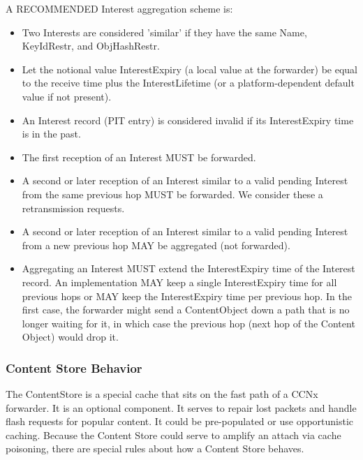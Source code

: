 \documentclass[12pt]{article}
\begin{document}
A RECOMMENDED Interest aggregation scheme is:

\begin{itemize}

\item Two Interests are considered 'similar' if they have the same Name,
   KeyIdRestr, and ObjHashRestr.

\item Let the notional value InterestExpiry (a local value at the
   forwarder) be equal to the receive time plus the InterestLifetime
   (or a platform-dependent default value if not present).

\item An Interest record (PIT entry) is considered invalid if its
   InterestExpiry time is in the past.

\item The first reception of an Interest MUST be forwarded.

\item A second or later reception of an Interest similar to a valid
   pending Interest from the same previous hop MUST be forwarded.  We
   consider these a retransmission requests.

\item A second or later reception of an Interest similar to a valid
   pending Interest from a new previous hop MAY be aggregated (not
   forwarded).

\item Aggregating an Interest MUST extend the InterestExpiry time of the
    Interest record.  An implementation MAY keep a single
    InterestExpiry time for all previous hops or MAY keep the
    InterestExpiry time per previous hop.  In the first case, the
    forwarder might send a ContentObject down a path that is no longer
    waiting for it, in which case the previous hop (next hop of the
    Content Object) would drop it.
\end{itemize}

\subsubsection{Content Store Behavior}
The ContentStore is a special cache that sits on the fast path of a
CCNx forwarder.  It is an optional component.  It serves to repair
lost packets and handle flash requests for popular content.  It could
be pre-populated or use opportunistic caching.  Because the Content
Store could serve to amplify an attach via cache poisoning, there are
special rules about how a Content Store behaves.
\end{document}
